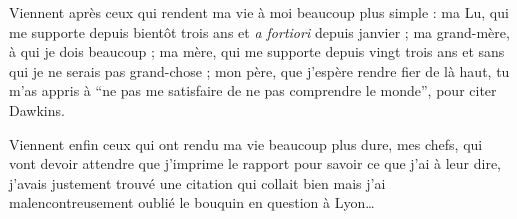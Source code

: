 Viennent après ceux qui rendent ma vie à moi beaucoup plus simple : ma Lu, qui
me supporte depuis bientôt trois ans et \emph{a fortiori} depuis janvier ; ma
grand-mère, à qui je dois beaucoup ; ma mère, qui me supporte depuis vingt trois
ans et sans qui je ne serais pas grand-chose ; mon père, que j'espère rendre
fier de là haut, tu m'as appris à ``ne pas me satisfaire de ne pas comprendre le
monde'', pour citer Dawkins.

Viennent enfin ceux qui ont rendu ma vie beaucoup plus dure, mes chefs, qui vont
devoir attendre que j'imprime le rapport pour savoir ce que j'ai à leur dire,
j'avais justement trouvé une citation qui collait bien mais j'ai
malencontreusement oublié le bouquin en question à Lyon…

\newpage

\blankpage

\tableofcontents
\newpage
\blankpage


\printacronyms[include-classes=abbrev,name=Abbréviations]


\listoffigures
\listoftables

\blankpage
\blankpage
\clearpage

\setcounter{page}{1}

\sffamily